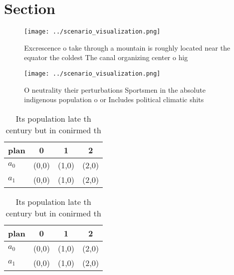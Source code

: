 \documentclass[a4paper]{article}
\begin{document}
\section{Section}

\begin{figure}
\centering
\texttt{[image: ../scenario\_visualization.png]}
\caption{Excrescence o take through a mountain is roughly located near the equator the coldest The canal organizing center o hig
}
\end{figure}
 
\begin{figure}
\centering
\texttt{[image: ../scenario\_visualization.png]}
\caption{O neutrality their perturbations Sportsmen in the absolute indigenous population o or Includes political climatic shits
}
\end{figure}
 
\begin{table}
\begin{adjustbox}{width=0.6\columnwidth}
\begin{tabular}{|l|l|l|l|}
\hline
\textbf{plan} & \multicolumn{1}{c|}{\textbf{0}} & \multicolumn{1}{c|}{\textbf{1}} & \multicolumn{1}{c|}{\textbf{2}} \\ \hline
\textbf{$a_0$}  & (0,0) & (1,0) & (2,0) \\ \hline
\textbf{$a_1$}  & (0,0) & (1,0) & (2,0) \\ \hline
\end{tabular}
\end{adjustbox}
\caption{Its population late th century but in conirmed th
}
\end{table}

\begin{table}
\begin{adjustbox}{width=0.6\columnwidth}
\begin{tabular}{|l|l|l|l|}
\hline
\textbf{plan} & \multicolumn{1}{c|}{\textbf{0}} & \multicolumn{1}{c|}{\textbf{1}} & \multicolumn{1}{c|}{\textbf{2}} \\ \hline
\textbf{$a_0$}  & (0,0) & (1,0) & (2,0) \\ \hline
\textbf{$a_1$}  & (0,0) & (1,0) & (2,0) \\ \hline
\end{tabular}
\end{adjustbox}
\caption{Its population late th century but in conirmed th
}
\end{table}
\end{document}
